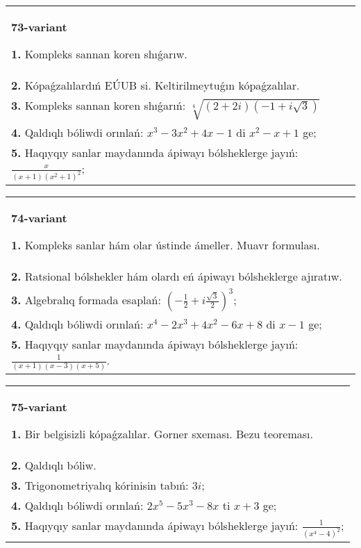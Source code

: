 \documentclass{article}
\begin{document}
\begin{tabular}{m{17cm}}
\textbf{73-variant}
\newline

\textbf{1.} Kompleks sannan koren shıǵarıw. \\
\textbf{2.} Kópaǵzalılardıń EÚUB si. Keltirilmeytuǵın   kópaǵzalılar. \\
\textbf{3.} Kompleks sannan koren shıǵarıń: $\sqrt[4]{(2+2 i)(-1+i \sqrt{3})}$ \\
\textbf{4.} Qaldıqlı bóliwdi orınlań:  $x^3-3 x^2+4 x-1$ di $x^2-x+1$ ge; \\
\textbf{5.} Haqıyqıy sanlar maydanında ápiwayı bólsheklerge jayıń:  $\frac{x}{(x+1)\left(x^2+1\right)^2}$; \\

\end{tabular}
\vspace{1cm}


\begin{tabular}{m{17cm}}
\textbf{74-variant}
\newline

\textbf{1.} Kompleks sanlar hám olar ústinde ámeller. Muavr formulası.  \\
\textbf{2.} Ratsional bólshekler hám olardı eń ápiwayı bólsheklerge ajıratıw. \\
\textbf{3.} Algebralıq formada esaplań:  $\left(-\frac{1}{2}+i \frac{\sqrt{3}}{2}\right)^3$; \\
\textbf{4.} Qaldıqlı bóliwdi orınlań: $x^4-2 x^3+4 x^2-6 x+8$ di $x-1$ ge; \\
\textbf{5.} Haqıyqıy sanlar maydanında ápiwayı bólsheklerge jayıń:  $\frac{1}{(x+1)(x-3)(x+5)}$. \\

\end{tabular}
\vspace{1cm}


\begin{tabular}{m{17cm}}
\textbf{75-variant}
\newline

\textbf{1.} Bir belgisizli kópaǵzalılar. Gorner sxeması. Bezu teoreması.  \\
\textbf{2.} Qaldıqlı bóliw.  \\
\textbf{3.} Trigonometriyalıq kórinisin tabıń: $3 i$; \\
\textbf{4.} Qaldıqlı bóliwdi orınlań: $2 x^5-5 x^3-8 x$ ti $x+3$ ge; \\
\textbf{5.} Haqıyqıy sanlar maydanında ápiwayı bólsheklerge jayıń:  $\frac{1}{\left(x^4-4\right)^2}$; \\

\end{tabular}
\vspace{1cm}
\end{document}
